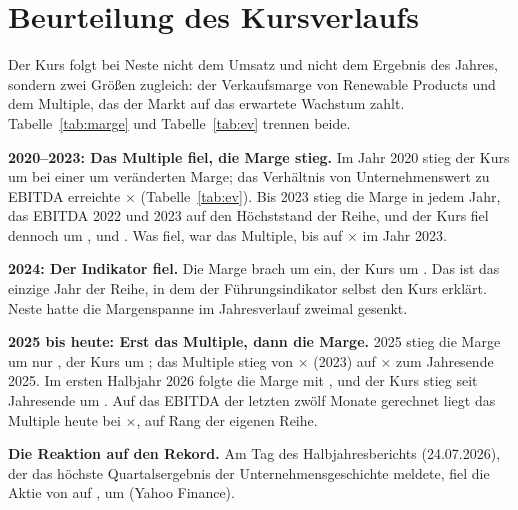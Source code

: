 \section{Beurteilung des Kursverlaufs}
\label{sec:kurs}

\margentabelle

Der Kurs folgt bei Neste nicht dem Umsatz und nicht dem Ergebnis des Jahres, sondern zwei
Gr\"o{\ss}en zugleich: der Verkaufsmarge von Renewable Products und dem Multiple, das der
Markt auf das erwartete Wachstum zahlt. Tabelle~\ref{tab:marge} und Tabelle~\ref{tab:ev}
trennen beide.

\textbf{2020--2023: Das Multiple fiel, die Marge stieg.} Im Jahr 2020 stieg der Kurs um
\KursDeltaXX{} bei einer um \MargeDeltaXX{} ver\"anderten Marge; das Verh\"altnis von
Unternehmenswert zu EBITDA erreichte \EvMax{}$\times$ (Tabelle~\ref{tab:ev}). Bis 2023 stieg
die Marge in jedem Jahr, das EBITDA 2022 und 2023 auf den H\"ochststand der Reihe, und der Kurs
fiel dennoch um \KursDeltaXXI{}, \KursDeltaXXII{} und \KursDeltaXXIII{}. Was fiel, war das
Multiple, bis auf \EvMin{}$\times$ im Jahr 2023. 

\textbf{2024: Der Indikator fiel.} Die Marge brach um \MargeDeltaXXIV{} ein, der Kurs um
\KursDeltaXXIV. Das ist das einzige Jahr der Reihe, in dem der F\"uhrungsindikator selbst den
Kurs erkl\"art. Neste hatte die Margenspanne im Jahresverlauf zweimal gesenkt.

\textbf{2025 bis heute: Erst das Multiple, dann die Marge.} 2025 stieg die Marge um nur
\MargeDeltaXXV, der Kurs um \KursDeltaXXV; das Multiple stieg von \EvXXIII{}$\times$ (2023) auf \EvXXV{}$\times$ zum
Jahresende 2025. Im ersten Halbjahr 2026 folgte die
Marge mit , und der Kurs stieg seit Jahresende um \KursSeitJahresende.
Auf das EBITDA der letzten zw\"olf Monate gerechnet liegt das Multiple heute bei
\EvHeuteLtm{}$\times$, auf Rang \Pz{\EvRangLtm} der eigenen Reihe.

\textbf{Die Reaktion auf den Rekord.} Am Tag des Halbjahresberichts (24.07.2026), der das
h\"ochste Quartalsergebnis der Unternehmensgeschichte meldete, fiel die Aktie von
 auf , um \ReaktionHj{}
(Yahoo Finance). 
